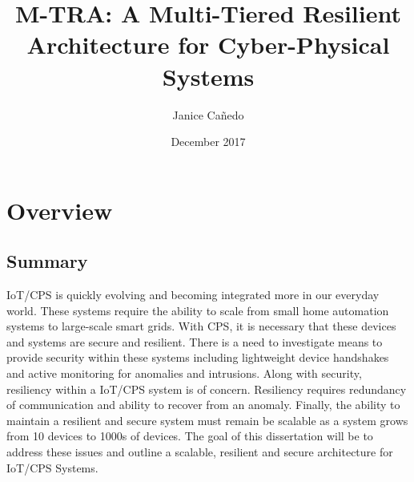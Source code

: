 \documentclass[12pt]{report}
\title{M-TRA: A Multi-Tiered Resilient Architecture for Cyber-Physical Systems}
\author{Janice Ca\~nedo}
\date{December 2017} %
\begin{document}
\begin{romanpages}      %

\TitlePage 


{}


\tableofcontents
\listoffigures
\listoftables

\printnomenclature[0.5in] %
\end{romanpages}        %


\normalem       %


\normalem       %

\chapter{Overview}  %

{}

\section{Summary}

IoT/CPS is quickly evolving and becoming integrated more in our everyday world. These systems require the ability to scale from small home automation systems to large-scale smart grids. With CPS, it is necessary that these devices and systems are secure and resilient. There is a need to investigate means to provide security within these systems including lightweight device handshakes and active monitoring for anomalies and intrusions. Along with security, resiliency within a IoT/CPS system is of concern. Resiliency requires redundancy of communication and ability to recover from an anomaly. Finally, the ability to maintain a resilient and secure system must remain be scalable as a system grows from 10 devices to 1000s of devices. The goal of this dissertation will be to address these issues and outline a scalable, resilient and secure architecture for IoT/CPS Systems.
\end{document}
